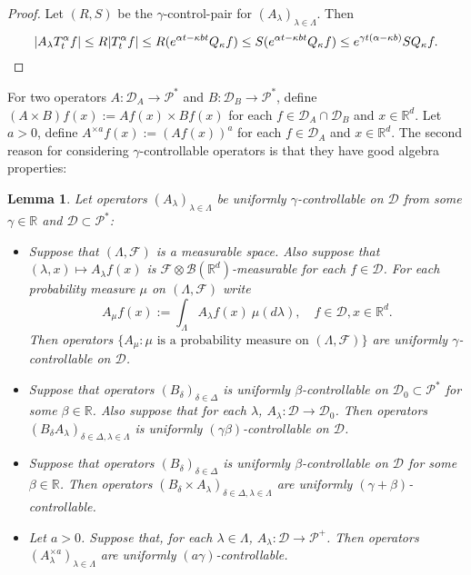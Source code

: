 \documentclass[12pt,oneside,english]{amsart}
\theoremstyle{plain}
\newtheorem{lem}[thm]{Lemma}
\theoremstyle{definition}
\numberwithin{equation}{section}
\begin{document}
\begin{proof}
    Let $(R,S)$ be the $\gamma$-control-pair for $(A_\lambda)_{\lambda\in \Lambda}$.
    Then
\[
    |A_\lambda T_t^\alpha f| \leq R|T_t^\alpha f|
    \leq R (e^{\alpha t  - \kappa bt}Q_{\kappa}f)
    \leq S (e^{\alpha t  - \kappa bt}Q_{\kappa}f)
    \leq e^{\gamma t (\alpha  - \kappa b)} SQ_{\kappa}f.
    \qedhere
\]
\end{proof}
	For two operators $A: \mathcal D_A \to \mathcal P^*$ and $B: \mathcal D_B \to \mathcal P^*$, define $(A\times B)f (x):= Af(x) \times Bf(x)$ for each $f\in \mathcal D_A \cap \mathcal D_B$ and $x\in \mathbb R^d$.
    Let $a > 0$, define $A^{\times a}f(x):= (Af(x))^a$ for each $f\in \mathcal D_A$ and $x\in \mathbb R^d$.
    The second reason for considering $\gamma$-controllable operators is that they have good algebra properties:
\begin{lem}
\label{lem: property of controllable operators}
    Let operators $(A_\lambda)_{\lambda\in \Lambda}$ be uniformly $\gamma$-controllable on $\mathcal D$ from some $\gamma \in \mathbb R$ and $\mathcal D\subset \mathcal P^*$:
\begin{itemize}
\item[(1)]
    Suppose that $(\Lambda, \mathscr F)$ is a measurable space.
    Also suppose that $(\lambda,x)\mapsto A_\lambda f(x)$ is $\mathscr F \otimes \mathscr B(\mathbb R^d)$-measurable for each $f\in \mathcal D$.
    For each probability measure $\mu$ on $(\Lambda, \mathscr F)$ write
\[
    A_\mu f(x):= \int_{\Lambda} A_\lambda f (x)~\mu(d\lambda), \quad f\in \mathcal D, x\in \mathbb R^d.
\]
    Then operators $\{A_\mu: \mu \text{ is  a probability measure on } (\Lambda, \mathscr F)\}$ are uniformly $\gamma$-controllable on $\mathcal D$.
\item[(2)]
    Suppose that operators $(B_\delta)_{\delta\in \Delta}$ is uniformly $\beta$-controllable on $\mathcal D_0 \subset \mathcal P^*$ for some $\beta \in \mathbb R$.
    Also suppose that for each $\lambda$, $A_\lambda:\mathcal D \to \mathcal D_0$.
    Then operators $(B_\delta A_\lambda)_{\delta\in \Delta, \lambda \in \Lambda}$ is uniformly $(\gamma\beta)$-controllable on $\mathcal D$.
\item[(3)]
    Suppose that operators $(B_\delta)_{\delta \in \Delta}$ is uniformly $\beta$-controllable on $\mathcal D$ for some $\beta\in \mathbb R$.
    Then operators $(B_\delta\times A_\lambda)_{\delta \in \Delta, \lambda \in \Lambda}$ are uniformly $(\gamma+\beta)$-controllable.
\item[(4)]
    Let $a>0$. Suppose that, for each $\lambda \in \Lambda$, $A_\lambda : \mathcal D \to \mathcal P^+$.
    Then operators $(A^{\times a}_\lambda)_{\lambda \in \Lambda}$ are uniformly $(a\gamma)$-controllable.
\end{itemize}
\end{lem}
\end{document}
